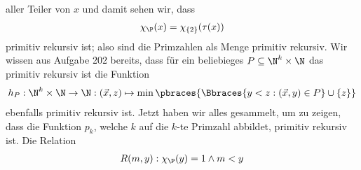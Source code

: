 \begin{solution}
\begin{enumerate}[label = (\alph*)]
\begin{enumerate}
				aller Teiler von $x$ und damit sehen wir, dass
				\begin{align*}
					\chi_\P(x) = \chi_{\{2\}}(\tau(x))
				\end{align*}
				primitiv rekursiv ist; also sind die Primzahlen als Menge primitiv rekursiv. \newline
				Wir wissen aus Aufgabe 202 bereits, dass für ein beliebieges $P \subseteq \N^k \times \N$ das primitiv rekursiv ist die Funktion
				\begin{align*}
				h_P: \N^k \times \N \to \N: (\vec{x}, z) \mapsto \min\pbraces{\Bbraces{y < z: (\vec{x}, y) \in P} \cup \{z\}}
				\end{align*}
				ebenfalls primitiv rekursiv ist.
%
%
				\newline
				Jetzt haben wir alles gesammelt, um zu zeigen, dass die Funktion
				$p_k$, welche $k$ auf die $k$-te Primzahl abbildet,
				primitiv rekursiv ist. Die Relation
				\begin{align*}
					R(m,y):  \chi_\P(y) = 1 \land m < y

\end{align*}
\end{enumerate}
\end{enumerate}
\end{solution}
